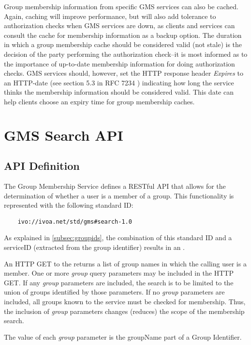 \documentclass[11pt,a4paper]{ivoa}
\begin{document}
Group membership information from specific GMS services can also be cached.  Again, caching will improve performance, but will also add tolerance to authorization checks when GMS services are down, as clients and services can consult the cache for membership information as a backup option.  The duration in which a group membership cache should be considered valid (not stale) is the decision of the party performing the authorization check--it is most informed as to the importance of up-to-date membership information for doing authorization checks.  GMS services should, however, set the HTTP response header \emph{Expires} to an HTTP-date (see section 5.3 in RFC 7234 \citep{std:RFC7234}) indicating how long the service thinks the membership information should be considered valid.  This date can help clients choose an expiry time for group membership caches.

\section{GMS Search API}

\subsection{API Definition}
\label{subsec:api}

The Group Membership Service defines a RESTful API \citep{fielding00} that allows for the determination of whether a user is a member of a group.  This functionality is represented with the following standard ID:

\begin{verbatim}
    ivo://ivoa.net/std/gms#search-1.0
\end{verbatim}

As explained in \ref{subsec:groupids}, the combination of this standard ID and a serviceID (extracted from the group identifier) results in an .

An HTTP GET to the  returns a list of group names in which the calling user is a member.  One or more \emph{group} query parameters may be included in the HTTP GET.  If any \emph{group} parameters are included, the search is to be limited to the union of groups identified by those parameters.  If no \emph{group} parameters are included, all groups known to the service must be checked for membership.  Thus, the inclusion of \emph{group} parameters changes (reduces) the scope of the membership search.

The value of each \emph{group} parameter is the groupName part of a Group Identifier.
\end{document}
